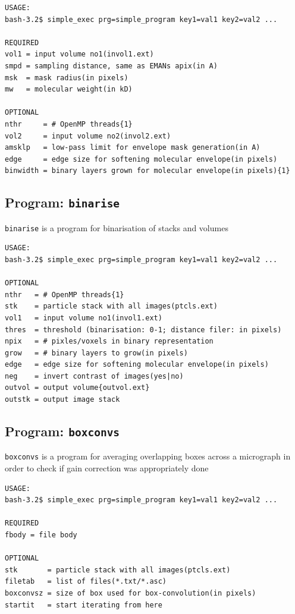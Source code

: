 \documentclass[a4paper,11pt]{article}
\newcommand{\prgname}[1]{\textcolor{NavyBlue}{\texttt{#1}}}
\begin{document}
\begin{verbatim}
USAGE:
bash-3.2$ simple_exec prg=simple_program key1=val1 key2=val2 ...

REQUIRED
vol1 = input volume no1(invol1.ext)
smpd = sampling distance, same as EMANs apix(in A)
msk  = mask radius(in pixels)
mw   = molecular weight(in kD)

OPTIONAL
nthr     = # OpenMP threads{1}
vol2     = input volume no2(invol2.ext)
amsklp   = low-pass limit for envelope mask generation(in A)
edge     = edge size for softening molecular envelope(in pixels)
binwidth = binary layers grown for molecular envelope(in pixels){1}
\end{verbatim}

\subsection{Program: \prgname{binarise}}
\label{binarise}
\prgname{binarise} is a program for binarisation of stacks and volumes

\begin{verbatim}
USAGE:
bash-3.2$ simple_exec prg=simple_program key1=val1 key2=val2 ...

OPTIONAL
nthr   = # OpenMP threads{1}
stk    = particle stack with all images(ptcls.ext)
vol1   = input volume no1(invol1.ext)
thres  = threshold (binarisation: 0-1; distance filer: in pixels)
npix   = # pixles/voxels in binary representation
grow   = # binary layers to grow(in pixels)
edge   = edge size for softening molecular envelope(in pixels)
neg    = invert contrast of images(yes|no)
outvol = output volume{outvol.ext}
outstk = output image stack
\end{verbatim}

\subsection{Program: \prgname{boxconvs}}
\label{boxconvs}
\prgname{boxconvs} is a program for averaging overlapping boxes across a micrograph in order to check if gain correction was appropriately done

\begin{verbatim}
USAGE:
bash-3.2$ simple_exec prg=simple_program key1=val1 key2=val2 ...

REQUIRED
fbody = file body

OPTIONAL
stk       = particle stack with all images(ptcls.ext)
filetab   = list of files(*.txt/*.asc)
boxconvsz = size of box used for box-convolution(in pixels)
startit   = start iterating from here
\end{verbatim}
\end{document}
